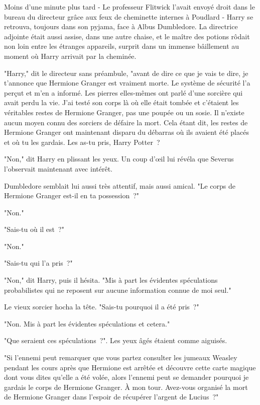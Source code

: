 Moins d'une minute plus tard - Le professeur Flitwick l'avait envoyé droit dans le bureau du directeur grâce aux feux de cheminette internes à Poudlard - Harry se retrouva, toujours dans son pyjama, face à Albus Dumbledore. La directrice adjointe était aussi assise, dans une autre chaise, et le maître des potions rôdait non loin entre les étranges appareils, surprit dans un immense bâillement au moment où Harry arrivait par la cheminée.

"Harry," dit le directeur sans préambule, "avant de dire ce que je vais te dire, je t'annonce que Hermione Granger est vraiment morte. Le système de sécurité l'a perçut et m'en a informé. Les pierres elles-mêmes ont parlé d'une sorcière qui avait perdu la vie. J'ai testé son corps là où elle était tombée et c'étaient les véritables restes de Hermione Granger, pas une poupée ou un sosie. Il n'existe aucun moyen connu des sorciers de défaire la mort. Cela étant dit, les restes de Hermione Granger ont maintenant disparu du débarras où ils avaient été placés et où tu les gardais. Les as-tu pris, Harry Potter~?

"Non," dit Harry en plissant les yeux. Un coup d'œil lui révéla que Severus l'observait maintenant avec intérêt.

Dumbledore semblait lui aussi très attentif, mais aussi amical. "Le corps de Hermione Granger est-il en ta possession~?"

"Non."

"Sais-tu où il est~?"

"Non."

"Sais-tu qui l'a pris~?"

"Non," dit Harry, puis il hésita. "Mis à part les évidentes spéculations probabilistes qui ne reposent sur aucune information connue de moi seul."

Le vieux sorcier hocha la tête. "Sais-tu pourquoi il a été pris~?"

"Non. Mis à part les évidentes spéculations et cetera."

"Que seraient ces spéculations~?". Les yeux âgés étaient comme aiguisés.

"Si l'ennemi peut remarquer que vous partez consulter les jumeaux Weasley pendant les cours après que Hermione est arrêtée et découvre cette carte magique dont vous dites qu'elle a été volée, alors l'ennemi peut se demander pourquoi je gardais le corps de Hermione Granger. À mon tour. Avez-vous organisé la mort de Hermione Granger dans l'espoir de récupérer l'argent de Lucius~?"

